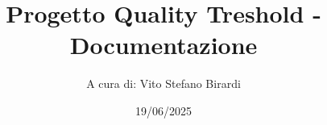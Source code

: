 
\newcommand{\Titolo}{Progetto Quality Treshold - Documentazione}
\newcommand{\Data}{19/06/2025}
\newcommand{\Materia}{}


\newcommand{\image}[3]{
    \begin{figure}[h!]
    \centering
    \texttt{[image: \#1]}
    \caption{#2}
    \label{#3}
\end{figure}}


\documentclass[a4paper]{article}
\usepackage{amsmath}
\usepackage{amssymb}


\usepackage[italian]{babel}


\usepackage{fancyvrb}
\usepackage{fancyhdr, lastpage}


\usepackage{cancel}
\usepackage{etoolbox}
\usepackage{xcolor}
\usepackage{subfig}
\usepackage{tikz, lmodern}
\usepackage[T1]{fontenc}
\usepackage[most]{tcolorbox}
\usepackage{graphicx}
\usepackage{hyperref}
\usepackage{parskip}
\usepackage{multicol}
\pagestyle{fancy}


\hypersetup{
    colorlinks=true,
    linkcolor=blue,
    filecolor=magenta, 
    urlcolor=blue,
    pdfpagemode=FullScreen
}


\lhead{\Data}
\lfoot{\Materia}
\renewcommand{\footrulewidth}{0.5pt}
\fancyfoot[C]{}
\patchcmd{\chapter}{\thispagestyle{plain}}{\thispagestyle{fancy}}{}


\title{\Titolo}
\author{
    A cura di: 
    Vito Stefano Birardi
}
\date{\Data}




\maketitle
\newpage
\hypertarget{toc}{\tableofcontents}
\newpage




%  


